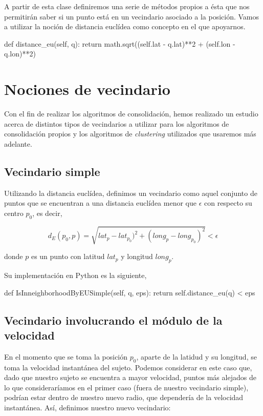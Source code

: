 \documentclass[a4paper, 12pt]{article}
\begin{document}
A partir de esta clase definiremos una serie de m\'etodos propios a \'esta que nos permitir\'an saber si un punto est\'a en un vecindario asociado a la posici\'on. Vamos a utilizar la noci\'on de distancia eucl\'idea como concepto en el que apoyarnos.\\

\begin{python}
        def distance_eu(self, q):
                return math.sqrt((self.lat - q.lat)**2 
                	+ (self.lon - q.lon)**2)
\end{python}


\pagebreak
\section{Nociones de vecindario}

Con el fin de realizar los algoritmos de consolidaci\'on, hemos realizado un estudio acerca de distintos tipos de vecindarios a utilizar para los algoritmos de consolidaci\'on propios y los algoritmos de \textit{clustering} utilizados que usaremos m\'as adelante.

\subsection{Vecindario simple}

Utilizando la distancia eucl\'idea, definimos un vecindario como aquel conjunto de puntos que se  encuentran a una distancia eucl\'idea menor que $\epsilon$ con respecto su centro $p_0$, es decir,

$$ d_E(p_0, p) = \sqrt{lat_{p} - lat_{p_0})^2 + (long_{p} - long_{p_0})^2 } < \epsilon $$

donde $p$ es un punto con latitud $lat_{p}$ y longitud $long_{p}$.

Su implementaci\'on en Python es la siguiente,

\begin{python}
        def IsInneighborhoodByEUSimple(self, q, eps):
                return self.distance_eu(q) < eps
\end{python}


\subsection{Vecindario involucrando el m\'odulo de la velocidad}

En el momento que se toma la posici\'on $p_0$, aparte de la latidud y su longitud, se toma la velocidad instant\'anea del sujeto. Podemos considerar en este caso que, dado que nuestro sujeto se  encuentra a mayor velocidad, puntos m\'as alejados de lo que considerar\'iamos en el primer caso (fuera de nuestro vecindario simple), podr\'ian estar dentro de nuestro nuevo radio, que depender\'ia de la velocidad instant\'anea. As\'i, definimos nuestro nuevo vecindario:
\end{document}
